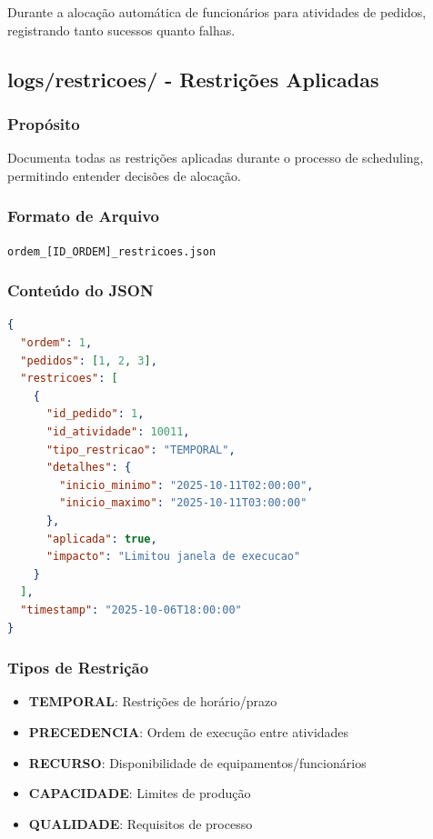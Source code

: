 \documentclass[11pt,a4paper]{article}
\begin{document}
Durante a alocação automática de funcionários para atividades de pedidos, registrando tanto sucessos quanto falhas.

\subsection{logs/restricoes/ - Restrições Aplicadas}

\subsubsection{Propósito}

Documenta todas as restrições aplicadas durante o processo de scheduling, permitindo entender decisões de alocação.

\subsubsection{Formato de Arquivo}

\texttt{ordem\_[ID\_ORDEM]\_restricoes.json}

\subsubsection{Conteúdo do JSON}

\begin{tcolorbox}[colback=codebg,colframe=headerblue,title=Estrutura de Restrições]
\begin{lstlisting}[language=json]
{
  "ordem": 1,
  "pedidos": [1, 2, 3],
  "restricoes": [
    {
      "id_pedido": 1,
      "id_atividade": 10011,
      "tipo_restricao": "TEMPORAL",
      "detalhes": {
        "inicio_minimo": "2025-10-11T02:00:00",
        "inicio_maximo": "2025-10-11T03:00:00"
      },
      "aplicada": true,
      "impacto": "Limitou janela de execucao"
    }
  ],
  "timestamp": "2025-10-06T18:00:00"
}
\end{lstlisting}
\end{tcolorbox}

\subsubsection{Tipos de Restrição}

\begin{itemize}[leftmargin=2cm]
    \item \textbf{TEMPORAL}: Restrições de horário/prazo
    \item \textbf{PRECEDENCIA}: Ordem de execução entre atividades
    \item \textbf{RECURSO}: Disponibilidade de equipamentos/funcionários
    \item \textbf{CAPACIDADE}: Limites de produção
    \item \textbf{QUALIDADE}: Requisitos de processo
\end{itemize}
\end{document}

